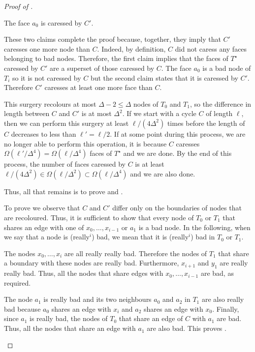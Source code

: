 \documentclass{patmorin}
\newcommand{\dual}[1]{{#1}^\star}
\begin{document}
\begin{proof}[Proof of ]
\begin{enumerate}
   \begin{clm}
      The face $a_0$ is caressed by $C'$.
   \end{clm}

   These two claims complete the proof because, together,
   they imply that $C'$ caresses one more node than $C$.  Indeed, by
   definition, $C$ did not caress any faces belonging to bad nodes.
   Therefore, the first claim implies that the faces of $\dual{T}$
   caressed by $C'$ are a superset of those caressed by $C$.  The face
   $a_0$ is a bad node of $T_i$ so it is not caressed by $C$ but the
   second claim states that it is caressed by $C'$.  Therefore $C'$
   caresses at least one more face than $C$.

   This surgery recolours at most $\Delta-2\le \Delta$ nodes of $T_0$
   and $T_1$, so the difference in length between $C$ and $C'$
   is at most $\Delta^2$.  If we start with a cycle $C$
   of length $\ell$, then we can perform this surgery at least
   $\ell/(4\Delta^2)$ times before the length of $C$ decreases
   to less than $\ell'=\ell/2$. If at some point during this process,
   we are no longer able to perform this operation, it is because
   $C$ caresses $\Omega(\ell'/\Delta^4)=\Omega(\ell/\Delta^4)$
   faces of $\dual{T}$ and we are done.  By the end of this
   process, the number of faces caressed by $C$ is at least
   $\ell/(4\Delta^2)\in\Omega(\ell/\Delta^2)\subset\Omega(\ell/\Delta^4)$
   and we are also done.

   Thus, all that remains is to prove  and
   .

   To prove  we observe that $C$ and $C'$ differ only on
   the boundaries of nodes that are recoloured.  Thus, it is sufficient
   to show that every node of $T_0$ or $T_1$ that shares an edge with one
   of $x_0,\ldots,x_{i-1}$ or $a_1$ is a bad node.  In the following,
   when we say that a node is (really$^i$) bad, we mean that it is
   (really$^i$) bad in $T_0$ or $T_1$.

   The nodes $x_0,\ldots,x_i$ are all really really bad. Therefore the
   nodes of $T_1$ that share a boundary with these nodes are really bad.
   Furthermore, $x_{i+1}$ and $y_1$ are really really bad.  Thus, all the
   nodes that share edges with $x_0,\ldots,x_{i-1}$ are bad, as required.

   The node $a_1$ is really bad and its two neighbours $a_0$ and $a_2$
   in $T_1$ are also really bad because $a_0$ shares an edge with $x_i$
   and $a_2$ shares an edge with $x_0$.  Finally, since $a_1$ is really
   bad, the nodes of $T_0$ that share an edge of $C$ with $a_1$ are bad.
   Thus, all the nodes that share an edge with $a_1$ are also bad.
   This proves .


\end{enumerate}
\end{proof}
\end{document}
